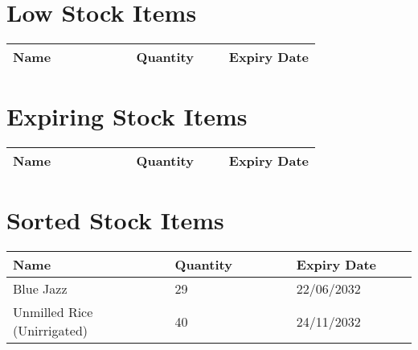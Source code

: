 \documentclass{article}
\begin{document}
\vspace*{-1in}
\section*{Low Stock Items}
\noindent\hspace*{-\oddsidemargin}\begin{tabular}{|p{0.4\linewidth}|p{0.3\linewidth}|p{0.3\linewidth}|}
\hline
\textbf{Name} & \textbf{Quantity} & \textbf{Expiry Date}\\
\hline
\end{tabular}

\section*{Expiring Stock Items}
\noindent\hspace*{-\oddsidemargin}\begin{tabular}{|p{0.4\linewidth}|p{0.3\linewidth}|p{0.3\linewidth}|}
\hline
\textbf{Name} & \textbf{Quantity} & \textbf{Expiry Date}\\
\hline
\end{tabular}

\section*{Sorted Stock Items}
\noindent\hspace*{-\oddsidemargin}\begin{tabular}{|p{0.4\linewidth}|p{0.3\linewidth}|p{0.3\linewidth}|}
\hline
\textbf{Name} & \textbf{Quantity} & \textbf{Expiry Date}\\
\hline
Blue Jazz & 29 & 22/06/2032 \\
\hline
Unmilled Rice (Unirrigated) & 40 & 24/11/2032 \\
\hline
\end{tabular}
\end{document}
